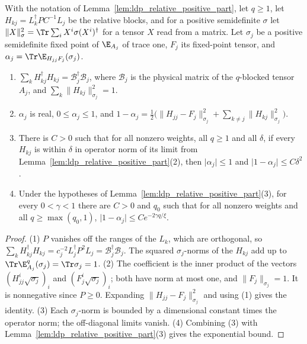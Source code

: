 \begin{lemma}
    \label{lem:ldp_relative_diagonal_deficit}
    \leanok
    With the notation of Lemma~\ref{lem:ldp_relative_positive_part}, let $q\geq1$, let
    $H_{kj}=L_k^\dagger PC^{-1}L_j$ be the relative blocks, and for a positive
    semidefinite $\sigma$ let $\lVert X\rVert_\sigma^2=\Tr\sum_iX^i\sigma(X^i)^\dagger$
    for a tensor $X$ read from a matrix. Let $\sigma_j$ be a positive semidefinite fixed
    point of $\E_{A_j}$ of trace one, $F_j$ its fixed-point tensor, and
    $\alpha_j=\Tr\E_{H_{jj}F_j}(\sigma_j)$.
    \begin{enumerate}
        \item $\sum_kH_{kj}^\dagger H_{kj}=\mathcal B_j^\dagger\mathcal B_j$, where
              $\mathcal B_j$ is the physical matrix of the $q$-blocked tensor $A_j$, and
              $\sum_k\lVert H_{kj}\rVert_{\sigma_j}^2=1$.
        \item $\alpha_j$ is real, $0\leq\alpha_j\leq1$, and
              $1-\alpha_j=\tfrac12\bigl(\lVert H_{jj}-F_j\rVert_{\sigma_j}^2
                  +\sum_{k\neq j}\lVert H_{kj}\rVert_{\sigma_j}^2\bigr)$.
        \item There is $C>0$ such that for all nonzero weights, all $q\geq1$ and all $\delta$,
              if every $H_{kj}$ is within $\delta$ in operator norm of its limit from
              Lemma~\ref{lem:ldp_relative_positive_part}(2), then $\lvert\alpha_j\rvert\leq1$
              and $\lvert1-\alpha_j\rvert\leq C\delta^2$.
        \item Under the hypotheses of Lemma~\ref{lem:ldp_relative_positive_part}(3), for
              every $0<\gamma<1$ there are $C>0$ and $q_0$ such that for all nonzero
              weights and all $q\geq\max(q_0,1)$,
              $\lvert1-\alpha_j\rvert\leq Ce^{-2\gamma q/\xi}$.
    \end{enumerate}
\end{lemma}
\begin{proof}
    \leanok
    (1) $P$ vanishes off the ranges of the $L_k$, which are orthogonal, so
    $\sum_kH_{kj}^\dagger H_{kj}=c_j^{-2}L_j^\dagger P^2L_j=\mathcal B_j^\dagger\mathcal B_j$.
    The squared $\sigma_j$-norms of the $H_{kj}$ add up to
    $\Tr\E_{A_j}^q(\sigma_j)=\Tr\sigma_j=1$. (2) The coefficient is the inner product of
    the vectors $(H_{jj}^i\sqrt{\sigma_j})_i$ and $(F_j^i\sqrt{\sigma_j})_i$; both have
    norm at most one, and $\lVert F_j\rVert_{\sigma_j}=1$. It is nonnegative since $P\geq0$.
    Expanding $\lVert H_{jj}-F_j\rVert_{\sigma_j}^2$ and using (1) gives the identity.
    (3) Each $\sigma_j$-norm is bounded by a dimensional constant times the operator norm;
    the off-diagonal limits vanish. (4) Combining (3) with
    Lemma~\ref{lem:ldp_relative_positive_part}(3) gives the exponential bound.
\end{proof}


